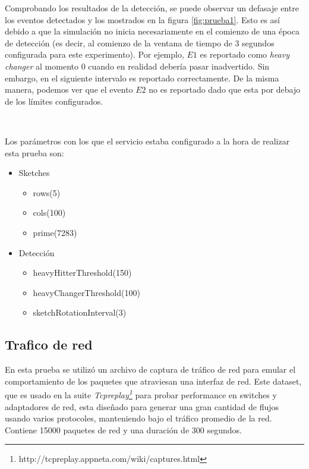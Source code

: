\documentclass[a4paper,10pt, oneside]{article}
\begin{document}
Comprobando los resultados de la detección, se puede observar un defasaje entre los eventos detectados y los mostrados en la figura \ref{fig:prueba1}. Esto es así debido a que la simulación no inicia necesariamente en el comienzo de una época de detección (es decir, al comienzo de la ventana de tiempo de $3$ segundos configurada para este experimento). Por ejemplo, $E1$ es reportado como \textit{heavy changer} al momento $0$ cuando en realidad debería pasar inadvertido. Sin embargo, en el siguiente intervalo es reportado correctamente.
De la misma manera, podemos ver que el evento $E2$ no es reportado dado que esta por debajo de los límites configurados.

\

Los parámetros con los que el servicio estaba configurado a la hora de realizar esta prueba son: 

\begin{multicols}{2}
	\begin{itemize}
		\item Sketches
		\begin{itemize}
			\item rows(5)
			\item cols(100)
			\item prime(7283)
		\end{itemize}
	\end{itemize}
	\columnbreak
	\begin{itemize}
		\item Detección
		\begin{itemize}
			\item heavyHitterThreshold(150)
			\item heavyChangerThreshold(100)
			\item sketchRotationInterval(3)
		\end{itemize}
	\end{itemize}
\end{multicols}

\subsection{Trafico de red}
En esta prueba se utilizó un archivo de captura de tráfico de red para emular el comportamiento de los paquetes que atraviesan una interfaz de red. Este dataset, que es usado en la suite \textit{Tcpreplay\footnote{http://tcpreplay.appneta.com/wiki/captures.html}} para probar performance en switches y adaptadores de red, esta diseñado para generar una gran cantidad de flujos usando varios protocoles, manteniendo bajo el tráfico promedio de la red. Contiene 15000 paquetes de red y una duración de 300 segundos.
\end{document}
